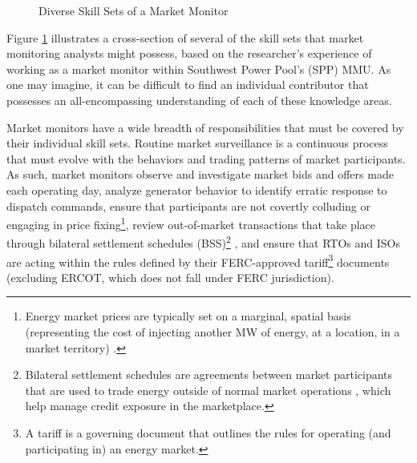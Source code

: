 \begin{figure}[h]
\centering
{}
\caption{Diverse Skill Sets of a Market Monitor}
\label{fig:skillset}
\end{figure}

Figure \ref{fig:skillset} illustrates a cross-section of several of the skill sets that market monitoring analysts might possess, based on the researcher's experience of working as a market monitor within Southwest Power Pool's (SPP) MMU. As one may imagine, it can be difficult to find an individual contributor that possesses an all-encompassing understanding of each of these knowledge areas.

Market monitors have a wide breadth of responsibilities that must be covered by their individual skill sets. Routine market surveillance is a continuous process that must evolve with the behaviors and trading patterns of market participants. As such, market monitors observe and investigate market bids and offers made each operating day, analyze generator behavior to identify erratic response to dispatch commands, ensure that participants are not covertly colluding or engaging in price fixing\footnote{Energy market prices are typically set on a marginal, spatial basis (representing the cost of injecting another MW of energy, at a location, in a market territory) \cite{lmpfaq}.}, review out-of-market transactions that take place through bilateral settlement schedules (BSS)\footnote{Bilateral settlement schedules are agreements between market participants that are used to trade energy outside of normal market operations \cite{spp-bss}, which help manage credit exposure in the marketplace.}
, and ensure that RTOs and ISOs are acting within the rules defined by their FERC-approved tariff\footnote{A tariff is a governing document that outlines the rules for operating (and participating in) an energy market.} documents (excluding ERCOT, which does not fall under FERC jurisdiction). 

